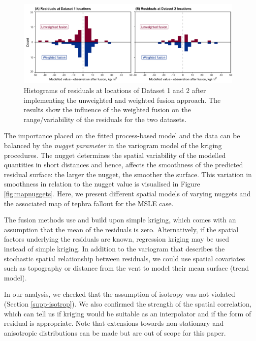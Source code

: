     \begin{figure}[htbp!]
    \centering
    \includegraphics[width=\linewidth]{Figures/fig8_histograms-kriging.png}
    \caption{Histograms of residuals at locations of Dataset 1 and 2 after implementing the unweighted and weighted fusion approach. The results show the influence of the weighted fusion on the range/variability of the residuals for the two datasets.}
    \label{fig:histkrig}
    \end{figure}

The importance placed on the fitted process-based model and the data can be balanced by the \textit{nugget parameter} in the variogram model of the kriging procedures. The nugget determines the spatial variability of the modelled quantities in short distances and hence, affects the smoothness of the predicted residual surface: the larger the nugget, the smoother the surface. This variation in smoothness in relation to the nugget value is visualised in Figure \ref{fig:mapnuggets}. Here, we present different spatial models of varying nuggets and the associated map of tephra fallout for the MSLE case. 

The fusion methods use and build upon simple kriging, which comes with an assumption that the mean of the residuals is zero. Alternatively, if the spatial factors underlying the residuals are known, regression kriging may be used instead of simple kriging. In addition to the variogram that describes the stochastic spatial relationship between residuals, we could use spatial covariates such as topography or distance from the vent to model their mean surface (trend model).

In our analysis, we checked that the assumption of isotropy was not violated (Section \ref{supp-isotrop}). We also confirmed the strength of the spatial correlation, which can tell us if kriging would be suitable as an interpolator and if the form of residual is appropriate. Note that extensions towards non-stationary and anisotropic distributions can be made but are out of scope for this paper.

